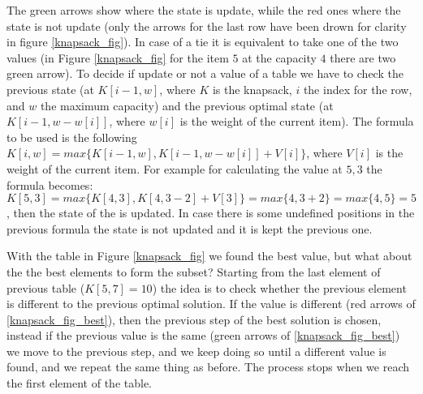 The green arrows show where the state is update, while the red ones where the state is not update (only the arrows for the last row have been drown for clarity in figure \ref{knapsack_fig}). In case of a tie it is equivalent to take one of the two values (in Figure \ref{knapsack_fig} for the item \(5\) at the capacity \(4\) there are two green arrow). To decide if update or not a value of a table we have to check the previous state (at \(K[i-1, w]\), where \(K\) is the knapsack, \(i\) the index for the row, and \(w\) the maximum capacity) and the previous optimal state (at \(K[i-1, w-w[i]]\), where \(w[i]\) is the weight of the current item). The formula to be used is the following \(K[i, w] = max \lbrace K[i-1, w], K[i-1, w-w[i]] + V[i]\rbrace \), where \(V[i]\) is the weight of the current item. For example for calculating the value at \(5, 3\) the formula becomes: \(K[5, 3]=max \lbrace K[4, 3], K[4, 3-2] + V[3]\rbrace=max \lbrace 4, 3 + 2 \rbrace = max \lbrace 4, 5 \rbrace = 5\), then the state of the is updated. In case there is some undefined positions in the previous formula the state is not updated and it is kept the previous one.

With the table in Figure \ref{knapsack_fig} we found the best value, but what about the the best elements to form the subset? Starting from the last element of previous table (\(K[5, 7]=10\)) the idea is to check whether the previous element is different to the previous optimal solution. If the value is different (red arrows of \ref{knapsack_fig_best}), then the previous step of the best solution is chosen, instead if the previous value is the same (green arrows of \ref{knapsack_fig_best}) we move to the previous step, and we keep doing so until a different value is found, and we repeat the same thing as before. The process stops when we reach the first element of the table.

